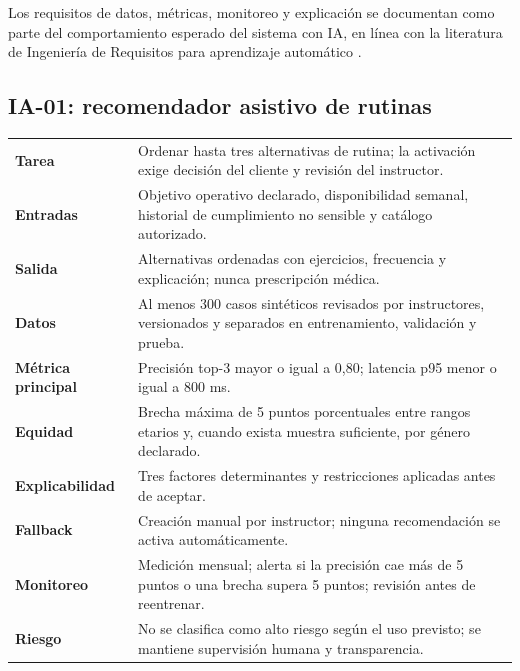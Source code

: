 Los requisitos de datos, métricas, monitoreo y explicación se documentan como parte del comportamiento esperado del sistema con IA, en línea con la literatura de Ingeniería de Requisitos para aprendizaje automático \cite{vogelsang}.

\subsection{IA-01: recomendador asistivo de rutinas}
\begin{tabularx}{\textwidth}{>{\bfseries}p{3.8cm}Y}
Tarea & Ordenar hasta tres alternativas de rutina; la activación exige decisión del cliente y revisión del instructor.\\
Entradas & Objetivo operativo declarado, disponibilidad semanal, historial de cumplimiento no sensible y catálogo autorizado.\\
Salida & Alternativas ordenadas con ejercicios, frecuencia y explicación; nunca prescripción médica.\\
Datos & Al menos 300 casos sintéticos revisados por instructores, versionados y separados en entrenamiento, validación y prueba.\\
Métrica principal & Precisión top-3 mayor o igual a 0,80; latencia p95 menor o igual a 800 ms.\\
Equidad & Brecha máxima de 5 puntos porcentuales entre rangos etarios y, cuando exista muestra suficiente, por género declarado.\\
Explicabilidad & Tres factores determinantes y restricciones aplicadas antes de aceptar.\\
Fallback & Creación manual por instructor; ninguna recomendación se activa automáticamente.\\
Monitoreo & Medición mensual; alerta si la precisión cae más de 5 puntos o una brecha supera 5 puntos; revisión antes de reentrenar.\\
Riesgo & No se clasifica como alto riesgo según el uso previsto; se mantiene supervisión humana y transparencia.\\
\end{tabularx}

